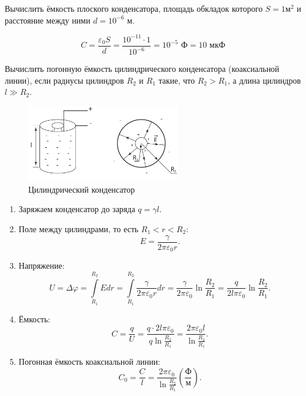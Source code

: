     \begin{example}
        Вычислить ёмкость плоского конденсатора, площадь обкладок которого
        \( S = 1 \text{м}^2\) и расстояние между ними \( d = 10^{-6} \) м.
    \end{example}

    \begin{solution}
        \[
            C = \frac{\varepsilon_0 S}{d} = \frac{10^{-11} \cdot 1}{10^{-6}} =
            10^{-5} \text{ Ф} = 10 \text{ мкФ}
        \]
    \end{solution}

    \begin{example}
        Вычислить погонную ёмкость цилиндрического конденсатора (коаксиальной
        линии), если радиусы цилиндров \( R_2 \) и \( R_1 \) такие, что 
        \( R_2 > R_1 \), а длина цилиндров \( l \gg R_2 \).
    \end{example}

    \begin{figure}[t!]
        \center
        \includegraphics[width=0.6\textwidth]{lec04/cylinder_capacitor.pdf}
        \caption{Цилиндрический конденсатор}
    \end{figure}

    \begin{solution}
        \begin{enumerate}
            \item Заряжаем конденсатор до заряда \( q = \gamma l \).
            \item Поле между цилиндрами, то есть \( R_1 < r < R_2 \):
            \[
                 E = \frac{\gamma}{2\pi\varepsilon_0 r}.
            \]
            \item Напряжение:
            \[
                U = \Delta\varphi = \int\limits_{R_1}^{R_2} Edr = 
                \int\limits_{R_1}^{R_2} \frac{\gamma}{2\pi\varepsilon_0 r}dr = 
                \frac{\gamma}{2\pi\varepsilon_0}\ln\frac{R_2}{R_1} = 
                \frac{q}{2l\pi\varepsilon_0}\ln\frac{R_2}{R_1}.
            \]
            \item Ёмкость:
            \[
                C = \frac{q}{U} =
                \frac{q \cdot 2l\pi\varepsilon_0 } {q\ln\frac{R_2}{R_1}} = 
                \frac{2\pi\varepsilon_0 l}{\ln\frac{R_2}{R_1}}.
            \]
            \item Погонная ёмкость коаксиальной линии:
            \[
                C_0 = \frac{C}{l} = \frac{2\pi\varepsilon_0}{\ln\frac{R_2}{R_1}} 
                \left(\frac{\text{Ф}}{\text{м}}\right).
            \]
        \end{enumerate}
    \end{solution}


